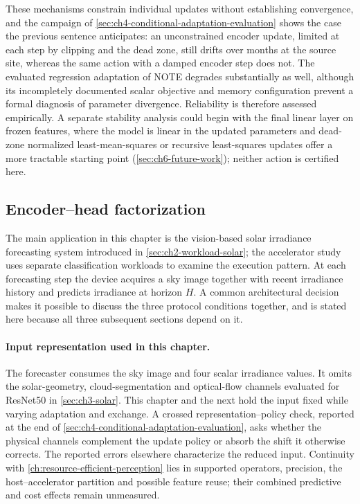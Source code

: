 These mechanisms constrain individual updates without establishing convergence, and the campaign of \cref{sec:ch4-conditional-adaptation-evaluation} shows the case the previous sentence anticipates: an unconstrained encoder update, limited at each step by clipping and the dead zone, still drifts over months at the source site, whereas the same action with a damped encoder step does not. The evaluated regression adaptation of NOTE degrades substantially as well, although its incompletely documented scalar objective and memory configuration prevent a formal diagnosis of parameter divergence. Reliability is therefore assessed empirically. A separate stability analysis could begin with the final linear layer on frozen features, where the model is linear in the updated parameters and dead-zone normalized least-mean-squares or recursive least-squares updates offer a more tractable starting point (\cref{sec:ch6-future-work}); neither action is certified here.

\subsection{Encoder--head factorization}
\label{sec:ch4-system-factorization}
The main application in this chapter is the vision-based solar irradiance forecasting system introduced in \cref{sec:ch2-workload-solar}; the accelerator study uses separate classification workloads to examine the execution pattern. At each forecasting step the device acquires a sky image together with recent irradiance history and predicts irradiance at horizon $H$. A common architectural decision makes it possible to discuss the three protocol conditions together, and is stated here because all three subsequent sections depend on it.

\paragraph{Input representation used in this chapter.} The forecaster consumes the sky image and four scalar irradiance values. It omits the solar-geometry, cloud-segmentation and optical-flow channels evaluated for ResNet50 in \cref{sec:ch3-solar}. This chapter and the next hold the input fixed while varying adaptation and exchange. A crossed representation--policy check, reported at the end of \cref{sec:ch4-conditional-adaptation-evaluation}, asks whether the physical channels complement the update policy or absorb the shift it otherwise corrects. The reported errors elsewhere characterize the reduced input. Continuity with \cref{ch:resource-efficient-perception} lies in supported operators, precision, the host--accelerator partition and possible feature reuse; their combined predictive and cost effects remain unmeasured.

